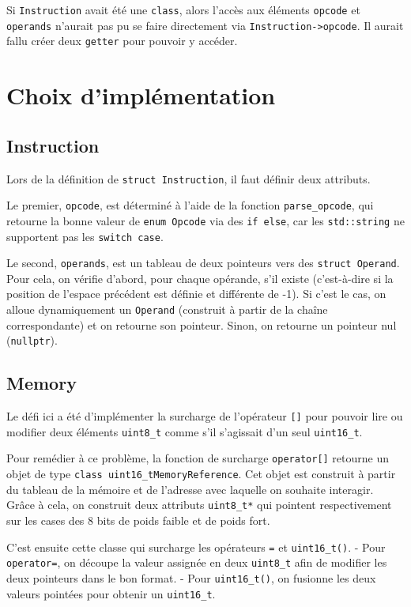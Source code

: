 \documentclass{article}
\begin{document}
Si \texttt{Instruction} avait été une \texttt{class}, alors l'accès aux éléments \texttt{opcode} et \texttt{operands} n'aurait pas pu se faire directement via \texttt{Instruction->opcode}. Il aurait fallu créer deux \texttt{getter} pour pouvoir y accéder.

\section{Choix d'implémentation}

\subsection{Instruction}

Lors de la définition de \texttt{struct Instruction}, il faut définir deux attributs.

Le premier, \texttt{opcode}, est déterminé à l’aide de la fonction \texttt{parse\_opcode}, qui retourne la bonne valeur de \texttt{enum Opcode} via des \texttt{if else}, car les \texttt{std::string} ne supportent pas les \texttt{switch case}.

Le second, \texttt{operands}, est un tableau de deux pointeurs vers des \texttt{struct Operand}. Pour cela, on vérifie d’abord, pour chaque opérande, s’il existe (c’est-à-dire si la position de l’espace précédent est définie et différente de -1). Si c’est le cas, on alloue dynamiquement un \texttt{Operand} (construit à partir de la chaîne correspondante) et on retourne son pointeur. Sinon, on retourne un pointeur nul (\texttt{nullptr}).

\subsection{Memory}

Le défi ici a été d'implémenter la surcharge de l'opérateur \texttt{[]} pour pouvoir lire ou modifier deux éléments \texttt{uint8_t} comme s'il s'agissait d'un seul \texttt{uint16_t}.

Pour remédier à ce problème, la fonction de surcharge \texttt{operator[]} retourne un objet de type \texttt{class uint16\_tMemoryReference}. Cet objet est construit à partir du tableau de la mémoire et de l'adresse avec laquelle on souhaite interagir. Grâce à cela, on construit deux attributs \texttt{uint8\_t*} qui pointent respectivement sur les cases des 8 bits de poids faible et de poids fort.

C’est ensuite cette classe qui surcharge les opérateurs \texttt{=} et \texttt{uint16\_t()}.  
- Pour \texttt{operator=}, on découpe la valeur assignée en deux \texttt{uint8\_t} afin de modifier les deux pointeurs dans le bon format.  
- Pour \texttt{uint16\_t()}, on fusionne les deux valeurs pointées pour obtenir un \texttt{uint16\_t}.
\end{document}
